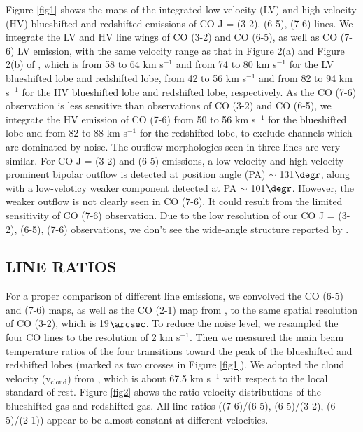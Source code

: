 Figure \ref{fig1} shows the maps of the integrated low-velocity (LV) and high-velocity (HV) blueshifted and redshifted emissions of CO J = (3-2), (6-5), (7-6) lines. We integrate the LV and HV line wings of CO (3-2) and CO (6-5), as well as CO (7-6) LV emission, with the same velocity range as that in Figure 2(a) and Figure 2(b) of \citet{2009ApJ...696...66Q} , which is from 58 to 64 km s$^{-1} $ and from 74 to 80 km s$^{-1}$ for the LV blueshifted lobe and redshifted lobe, from 42 to 56 km s$^{-1} $ and from 82 to 94 km s$^{-1}$ for the HV blueshifted lobe and redshifted lobe, respectively. As the CO (7-6) observation is less sensitive than observations of CO (3-2) and CO (6-5), we integrate the HV emission of CO (7-6) from 50 to 56 km s$^{-1} $ for the blueshifted lobe and from 82 to 88 km s$^{-1}$ for the redshifted lobe, to exclude channels which are dominated by noise. The outflow morphologies seen in three lines are very similar. For CO J = (3-2) and (6-5) emissions, a low-velocity and high-velocity prominent bipolar outflow is detected at position angle (PA) $\sim$ 131${\degr}$, along with a low-veloticy weaker component detected at PA $\sim$ 101${\degr}$. However, the weaker outflow is not clearly seen in CO (7-6). It could result from the limited sensitivity of CO (7-6) observation. Due to the low resolution of our CO J = (3-2), (6-5), (7-6) observations, we don't see the wide-angle structure reported by \citet{2009ApJ...696...66Q}.

\subsection{LINE RATIOS}
For a proper comparison of different line emissions, we convolved the CO (6-5) and (7-6) maps, as well as the CO (2-1) map from \citet{2009ApJ...696...66Q}, to the same spatial resolution of CO (3-2), which is 19${\arcsec}$. To reduce the noise level, we resampled the four CO lines to the resolution of 2 km s$^{-1}$. Then we measured the main beam temperature ratios of the four transitions toward the peak of the blueshifted and redshifted lobes (marked as two crosses in Figure \ref{fig1}). We adopted the cloud velocity (v$_{\mathrm{cloud}}$) from \citet{2003A&A...412..175K}, which is about 67.5 km s$^{-1}$ with respect to the local standard of rest. Figure \ref{fig2} shows the ratio-velocity distributions of the blueshifted gas and redshifted gas. All line ratios ((7-6)/(6-5), (6-5)/(3-2), (6-5)/(2-1)) appear to be almost constant at different velocities.

